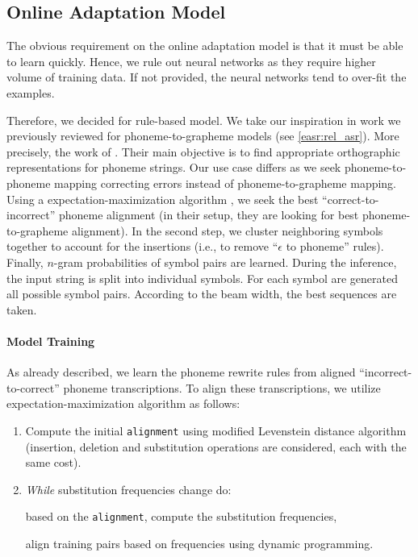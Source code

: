 \subsection{Online Adaptation Model}
The obvious requirement on the online adaptation model is that it must be able to learn quickly. Hence, we rule out neural networks as they require higher volume of training data. If not provided, the neural networks tend to over-fit the examples. 

Therefore, we decided for rule-based model. We take our inspiration in work we previously reviewed for phoneme-to-grapheme models (see \cref{easr:rel_asr}). More precisely, the work of . Their main objective is to find appropriate orthographic representations for phoneme strings. Our use case differs as we seek phoneme-to-phoneme mapping correcting errors instead of phoneme-to-grapheme mapping. Using a expectation-maximization algorithm , we seek the best ``correct-to-incorrect'' phoneme alignment (in their setup, they are looking for best phoneme-to-grapheme alignment). In the second step, we cluster neighboring symbols together to account for the insertions (i.e., to remove ``$\epsilon$ to phoneme'' rules). Finally, $n$-gram probabilities of symbol pairs are learned. During the inference, the input string is split into individual symbols. For each symbol are generated all possible symbol pairs. According to the beam width, the best sequences are taken. 

\paragraph{Model Training}
As already described, we learn the phoneme rewrite rules from aligned ``incorrect-to-correct'' phoneme transcriptions. To align these transcriptions, we utilize expectation-maximization algorithm as follows:

\begin{enumerate}
	\item Compute the initial \texttt{alignment} using modified Levenstein distance algorithm (insertion, deletion and substitution operations are considered, each with the same cost).
	
	\item \emph{While} substitution frequencies change do:
	\begin{enumerate}
		 based on the \texttt{alignment}, compute the substitution frequencies,
		
		 align training pairs  based on frequencies using dynamic programming.
	\end{enumerate}
\end{enumerate}

